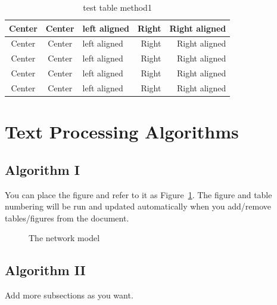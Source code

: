 \documentclass[12pt,oneside,openright,a4paper]{cpe-english-project}
\begin{document}

\begin{table}[!h]
\caption{test table method1}\label{tbl:method1}
\begin{tabular}{c|c|l|rr} \hline\hline
Center & Center & left aligned & Right & Right aligned \\ \hline\hline
Center & Center & left aligned & Right & Right aligned \\ \hline
Center & Center & left aligned & Right & Right aligned \\ 
Center & Center & left aligned & Right & Right aligned \\ \hline
Center & Center & left aligned & Right & Right aligned \\ \hline\hline
\end{tabular}
\end{table}


\section{Text Processing Algorithms}
\subsection{Algorithm I}

You can place the figure and refer to it as Figure~\ref{fig:model2}.
The figure and table numbering will be run and updated automatically when you add/remove tables/figures from the document.

\begin{figure}[!h]\centering
\setlength{\fboxrule}{0.2mm} %
\setlength{\fboxsep}{1cm}
\caption{The network model}\label{fig:model2}
\end{figure}

 
\subsection{Algorithm II}
Add more subsections as you want.
\end{document}
